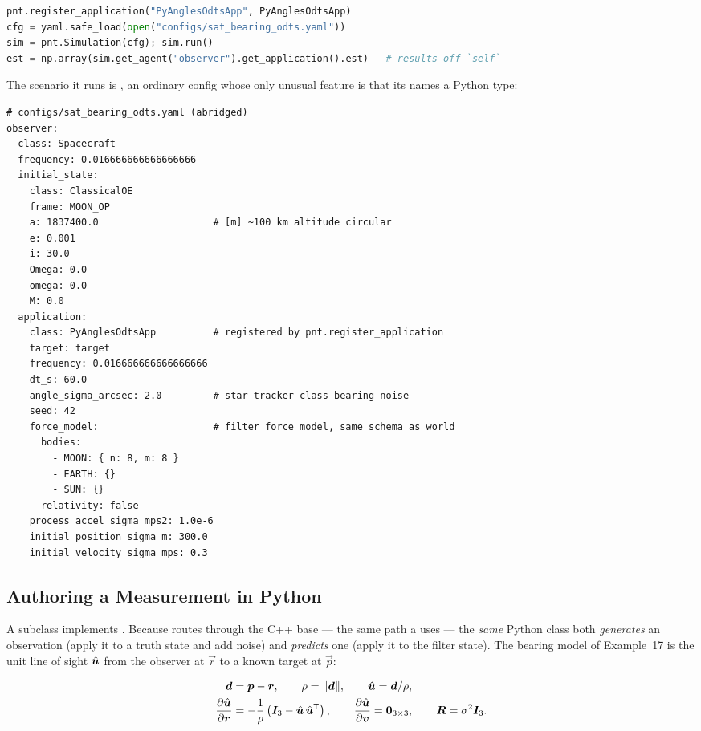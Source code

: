 \begin{lstlisting}[language=py, caption={An estimator application authored entirely in Python.}, label={lst:sim-py-app}]
pnt.register_application("PyAnglesOdtsApp", PyAnglesOdtsApp)
cfg = yaml.safe_load(open("configs/sat_bearing_odts.yaml"))
sim = pnt.Simulation(cfg); sim.run()
est = np.array(sim.get_agent("observer").get_application().est)   # results off `self`
\end{lstlisting}

The scenario it runs is , an ordinary config
whose only unusual feature is that its  names a Python type:

\begin{lstlisting}[language=yamlcfg, caption={A config whose application class is authored in Python.}, label={lst:sim-yaml-bearing}]
# configs/sat_bearing_odts.yaml (abridged)
observer:
  class: Spacecraft
  frequency: 0.016666666666666666
  initial_state:
    class: ClassicalOE
    frame: MOON_OP
    a: 1837400.0                    # [m] ~100 km altitude circular
    e: 0.001
    i: 30.0
    Omega: 0.0
    omega: 0.0
    M: 0.0
  application:
    class: PyAnglesOdtsApp          # registered by pnt.register_application
    target: target
    frequency: 0.016666666666666666
    dt_s: 60.0
    angle_sigma_arcsec: 2.0         # star-tracker class bearing noise
    seed: 42
    force_model:                    # filter force model, same schema as world
      bodies:
        - MOON: { n: 8, m: 8 }
        - EARTH: {}
        - SUN: {}
      relativity: false
    process_accel_sigma_mps2: 1.0e-6
    initial_position_sigma_m: 300.0
    initial_velocity_sigma_mps: 0.3
\end{lstlisting}

\subsection{Authoring a Measurement in Python}
\label{sec:sim-py-measurement}

A  subclass implements
. Because  routes through the
C++ base --- the same path a  uses --- the \emph{same} Python class
both \emph{generates} an observation (apply it to a truth state and add noise) and
\emph{predicts} one (apply it to the filter state). The bearing model of
Example~17 is the unit line of sight $\hat{\bm{u}}$ from the observer at $\vec{r}$ to a
known target at $\vec{p}$:

\begin{align}
  \bm{d} &= \bm{p} - \bm{r}, \qquad \rho = \lVert \bm{d} \rVert, \qquad
  \hat{\bm{u}} = \bm{d}/\rho, \label{eq:sim-bearing}\\
  \frac{\partial \hat{\bm{u}}}{\partial \bm{r}}
    &= -\frac{1}{\rho}\left(\bm{I}_3 - \hat{\bm{u}}\,\hat{\bm{u}}^{\mathsf{T}}\right),
  \qquad
  \frac{\partial \hat{\bm{u}}}{\partial \bm{v}} = \bm{0}_{3\times 3},
  \qquad
  \bm{R} = \sigma^2 \bm{I}_3. \label{eq:sim-bearing-jac}
\end{align}


